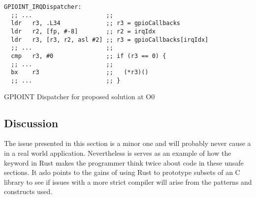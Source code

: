\begin{listing}[H]
  \begin{verbatim}
GPIOINT_IRQDispatcher:
  ;; ...                     ;;
  ldr   r3, .L34             ;; r3 = gpioCallbacks
  ldr   r2, [fp, #-8]        ;; r2 = irqIdx
  ldr   r3, [r3, r2, asl #2] ;; r3 = gpioCallbacks[irqIdx]
  ;; ...                     ;;
  cmp   r3, #0               ;; if (r3 == 0) {
  ;; ...                     ;;
  bx    r3                   ;;   (*r3)()
  ;; ...                     ;; }
  \end{verbatim}
  \caption{GPIOINT Dispatcher for proposed solution at O0}
  \label{lst:irq-dispatch:asm-fixed}
\end{listing}

\subsection{Discussion}

The issue presented in this section is a minor one and will probably never cause a  in a real world application.
Nevertheless is serves as an example of how the {\unsafe} keyword in Rust makes the programmer think twice about code in these unsafe sections.
It aslo points to the gains of using Rust to prototype subsets of an C library to see if issues with a more strict compiler will arise from the patterns and constructs used.

